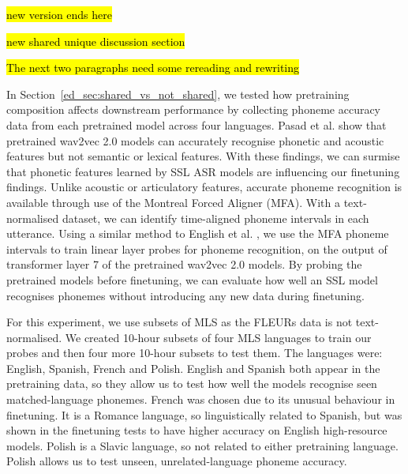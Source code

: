 \hl{new version ends here}


\hl{new shared unique discussion section}

\hl{The next two paragraphs need some rereading and rewriting}

In Section~\ref{ed_sec:shared_vs_not_shared}, we tested how pretraining composition affects downstream performance by collecting phoneme accuracy data from each pretrained model across four languages. Pasad et al. \cite{pasad2021layer} show that pretrained wav2vec 2.0 models can accurately recognise phonetic and acoustic features but not semantic or lexical features. With these findings, we can surmise that phonetic features learned by SSL ASR models are influencing our finetuning findings. Unlike acoustic or articulatory features, accurate phoneme recognition is available through use of the Montreal Forced Aligner (MFA). With a text-normalised dataset, we can identify time-aligned phoneme intervals in each utterance. Using a similar method to English et al. \cite{english2022domain}, we use the MFA phoneme intervals to train linear layer probes for phoneme recognition, on the output of transformer layer 7 of the pretrained wav2vec 2.0 models. By probing the pretrained models before finetuning, we can evaluate how well an SSL model recognises phonemes without introducing any new data during finetuning.   

For this experiment, we use subsets of MLS as the FLEURs data is not text-normalised. We created 10-hour subsets of four MLS languages to train our probes and then four more 10-hour subsets to test them. The languages were: English, Spanish, French and Polish. English and Spanish both appear in the pretraining data, so they allow us to test how well the models recognise seen matched-language phonemes. French was chosen due to its unusual behaviour in finetuning. It is a Romance language, so linguistically related to Spanish, but was shown in the finetuning tests to have higher accuracy on English high-resource models. Polish is a Slavic language, so not related to either pretraining language. Polish allows us to test unseen, unrelated-language phoneme accuracy.  

